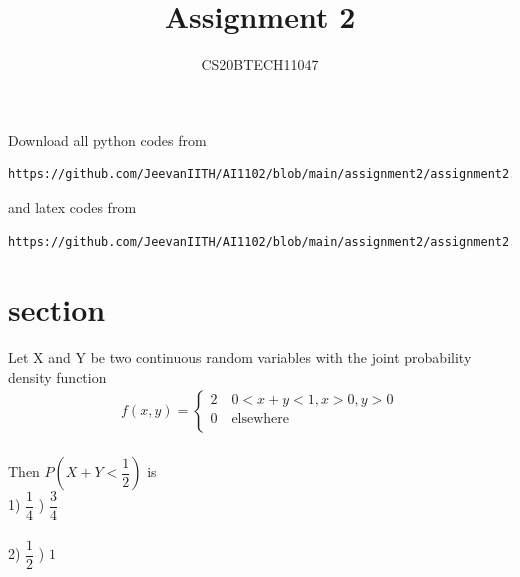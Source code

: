 \documentclass[journal,12pt,twocolumn]{IEEEtran}
\begin{document}
\let\vec\mathbf
\renewcommand{\thefigure}{\theproblem}
\def\putbox#1#2#3{\makebox[0in][l]{\makebox[#1][l]{}\raisebox{\baselineskip}[0in][0in]{\raisebox{#2}[0in][0in]{#3}}}}
     \def\rightbox#1{\makebox[0in][r]{#1}}
     \def\centbox#1{\makebox[0in]{#1}}
     \def\topbox#1{\raisebox{-\baselineskip}[0in][0in]{#1}}
     \def\midbox#1{\raisebox{-0.5\baselineskip}[0in][0in]{#1}}
\vspace{3cm}
\title{Assignment 2}
\author{CS20BTECH11047}
\maketitle
\newpage
\bigskip
\renewcommand{\thefigure}{\arabic{figure}}
\renewcommand{\thetable}{\arabic{table}}
Download all python codes from 
\begin{lstlisting}
https://github.com/JeevanIITH/AI1102/blob/main/assignment2/assignment2.py
\end{lstlisting}
%
and latex codes from 
%
\begin{lstlisting}
https://github.com/JeevanIITH/AI1102/blob/main/assignment2/assignment2.tex
\end{lstlisting}
\section*{section}
Let X and Y be two continuous random variables with the joint probability density function\\
\begin{align}
    f\left(x,y\right)=\begin{cases}
    2 \quad  0<x+y<1 ,x>0 ,y>0\\
    0 \quad  \textrm{elsewhere}\\
    \end{cases}
\end{align}
\\
Then $P\left(X+Y<\dfrac{1}{2}\right)$ is \\
1) $\dfrac{1}{4}$  \quad {}) $\dfrac{3}{4}$\\
\\
2) $\dfrac{1}{2}$  \quad {}) $1$
\end{document}
